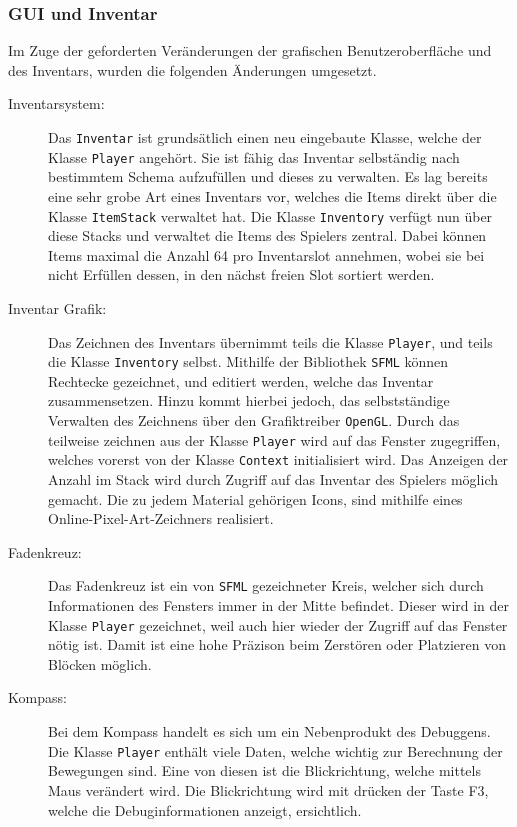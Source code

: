 \documentclass{article}
\begin{document}
\subsubsection{GUI und Inventar}

Im Zuge der geforderten Veränderungen der grafischen Benutzeroberfläche und des Inventars, wurden die folgenden Änderungen umgesetzt.

\begin{description}
  \item[Inventarsystem:] Das \texttt{Inventar} ist grundsätlich einen neu eingebaute Klasse, welche der Klasse \texttt{Player} angehört. Sie ist fähig das Inventar selbständig nach bestimmtem Schema aufzufüllen und dieses zu verwalten. Es lag bereits eine sehr grobe Art eines Inventars vor, welches die Items direkt über die Klasse \texttt{ItemStack} verwaltet hat. Die Klasse \texttt{Inventory} verfügt nun über diese Stacks und verwaltet die Items des Spielers zentral. Dabei können Items maximal die Anzahl 64 pro Inventarslot annehmen, wobei sie bei nicht Erfüllen dessen, in den nächst freien Slot sortiert werden.
  \item[Inventar Grafik:] Das Zeichnen des Inventars übernimmt teils die Klasse \linebreak[4]\texttt{Player}, und teils die Klasse \texttt{Inventory} selbst. Mithilfe der Bibliothek \texttt{SFML} können Rechtecke gezeichnet, und editiert werden, welche das Inventar zusammensetzen. Hinzu kommt hierbei jedoch, das selbstständige Verwalten des Zeichnens über den Grafiktreiber \texttt{OpenGL}. Durch das teilweise zeichnen aus der Klasse \texttt{Player} wird auf das Fenster zugegriffen, welches vorerst von der Klasse \texttt{Context} initialisiert wird. Das Anzeigen der Anzahl im Stack wird durch Zugriff auf das Inventar des Spielers möglich gemacht. Die zu jedem Material gehörigen Icons, sind mithilfe eines Online-Pixel-Art-Zeichners realisiert. 
  \item[Fadenkreuz:] Das Fadenkreuz ist ein von \texttt{SFML} gezeichneter Kreis, welcher sich durch Informationen des Fensters immer in der Mitte befindet. Dieser wird in der Klasse \texttt{Player} gezeichnet, weil auch hier wieder der Zugriff auf das Fenster nötig ist. Damit ist eine hohe Präzison beim Zerstören oder Platzieren von Blöcken möglich.
  \item[Kompass:] Bei dem Kompass handelt es sich um ein Nebenprodukt des Debuggens. Die Klasse \texttt{Player} enthält viele Daten, welche wichtig zur Berechnung der Bewegungen sind. Eine von diesen ist die Blickrichtung, welche mittels Maus verändert wird. Die Blickrichtung wird mit drücken der Taste F3, welche die Debuginformationen anzeigt, ersichtlich. 
\end{description}
\end{document}

